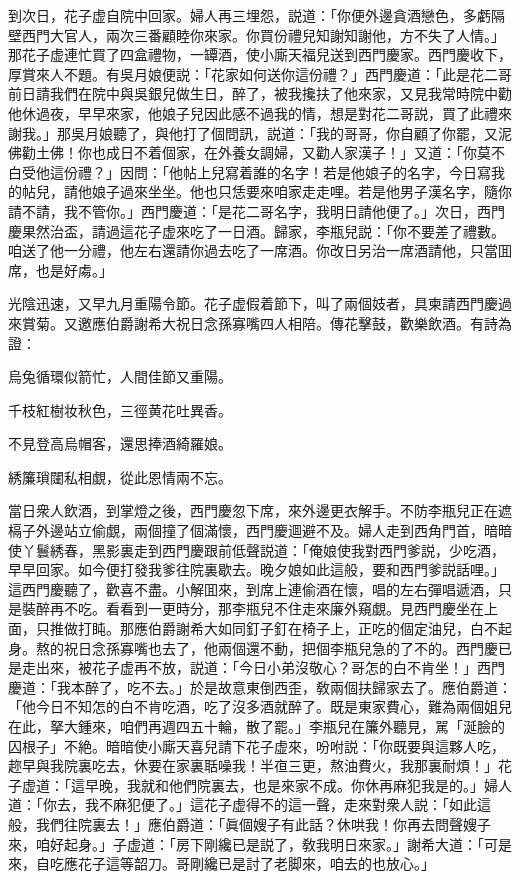 到次日，花子虚自院中回家。婦人再三埋怨，説道：「你便外邊貪酒戀色，多虧隔壁西門大官人，兩次三番顧睦你來家。你買份禮兒知謝知謝他，方不失了人情。」那花子虚連忙買了四盒禮物，一罈酒，使小廝天福兒送到西門慶家。西門慶收下，厚賞來人不題。有吳月娘便説：「花家如何送你這份禮？」西門慶道：「此是花二哥前日請我們在院中與吳銀兒做生日，醉了，被我攙扶了他來家，又見我常時院中勸他休過夜，早早來家，他娘子兒因此感不過我的情，想是對花二哥説，買了此禮來謝我。」那吳月娘聽了，與他打了個問訊，説道：「我的哥哥，你自顧了你罷，又泥佛勸土佛！你也成日不着個家，在外養女調婦，又勸人家漢子！」又道：「你莫不白受他這份禮？」因問：「他帖上兒寫着誰的名字！若是他娘子的名字，今日寫我的帖兒，請他娘子過來坐坐。他也只恁要來咱家走走哩。若是他男子漢名字，隨你請不請，我不管你。」西門慶道：「是花二哥名字，我明日請他便了。」次日，西門慶果然治盃，請過這花子虚來吃了一日酒。歸家，李瓶兒説：「你不要差了禮數。咱送了他一分禮，他左右還請你過去吃了一席酒。你改日另治一席酒請他，只當囬席，也是好䖏。」

光陰迅速，又早九月重陽令節。花子虚假着節下，叫了兩個妓者，具柬請西門慶過來賞菊。又邀應伯爵謝希大祝日念孫寡嘴四人相陪。傳花擊鼓，歡樂飲酒。有詩為證：

\begin{myquote}
烏兔循環似箭忙，人間佳節又重陽。

千枝紅樹妆秋色，三徑黄花吐異香。

不見登高烏帽客，還思捧酒綺羅娘。

綉簾瑣闥私相覷，從此恩情兩不忘。
\end{myquote}

當日衆人飲酒，到掌燈之後，西門慶忽下席，來外邊更衣解手。不防李瓶兒正在遮槅子外邊站立偷覷，兩個撞了個滿懷，西門慶逥避不及。婦人走到西角門首，暗暗使丫鬟綉春，黑影裏走到西門慶跟前低聲説道：「俺娘使我對西門爹説，少吃酒，早早回家。如今便打發我爹往院裏歇去。晚夕娘如此這般，要和西門爹説話哩。」這西門慶聽了，歡喜不盡。小解囬來，到席上連偷酒在懷，唱的左右彈唱遞酒，只是裝醉再不吃。看看到一更時分，那李瓶兒不住走來廉外窺覷。見西門慶坐在上面，只推做打盹。那應伯爵謝希大如同釘子釘在椅子上，正吃的個定油兒，白不起身。熬的祝日念孫寡嘴也去了，他兩個還不動，把個李瓶兒急的了不的。西門慶已是走出來，被花子虚再不放，説道：「今日小弟沒敬心？哥怎的白不肯坐！」西門慶道：「我本醉了，吃不去。」於是故意東倒西歪，敎兩個扶歸家去了。應伯爵道：「他今日不知怎的白不肯吃酒，吃了沒多酒就醉了。既是東家費心，難為兩個姐兒在此，拏大鍾來，咱們再週四五十輪，散了罷。」李瓶兒在簾外聽見，駡「涎臉的囚根子」不絶。暗暗使小廝天喜兒請下花子虚來，吩咐説：「你既要與這夥人吃，趂早與我院裏吃去，休要在家裏聒噪我！半亱三更，熬油費火，我那裏耐煩！」花子虚道：「這早晚，我就和他們院裏去，也是來家不成。你休再麻犯我是的。」婦人道：「你去，我不麻犯便了。」這花子虚得不的這一聲，走來對衆人説：「如此這般，我們往院裏去！」應伯爵道：「眞個嫂子有此話？休哄我！你再去問聲嫂子來，咱好起身。」子虚道：「房下剛纔已是説了，敎我明日來家。」謝希大道：「可是來，自吃應花子這等韶刀。哥剛纔已是討了老脚來，咱去的也放心。」


